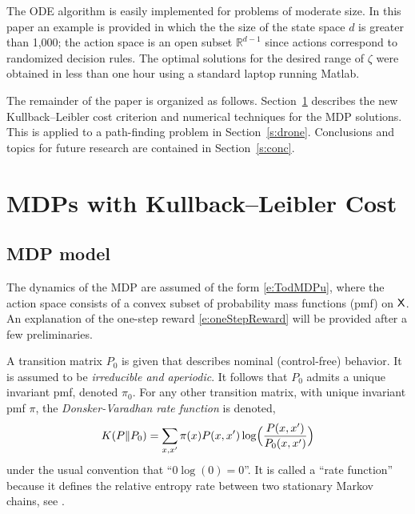 \documentclass[final,12pt]{colt2018} %
\def\state{{\sf X}}
\newcommand{\field}[1]{\mathbb{#1}}
\def\Re{\field{R}}
\def\Section#1{Section~\ref{#1}}
\def\Re{\field{R}}
\begin{document}
The ODE algorithm
is easily implemented for  problems of moderate size.   In this paper an example is provided in which the the size of the state space $d$ is greater than 1,000;   the action space is an open subset $\Re^{d-1}$ since actions correspond to randomized decision rules.   The optimal solutions for the desired range of $\zeta$ were obtained in less than one hour using a standard laptop running Matlab.

 



 



  
 
The remainder of the paper is organized as follows.   
\Section{s:design} describes the new Kullback--Leibler cost criterion and numerical techniques for the MDP solutions.    This is applied to a path-finding problem in \Section{s:drone}.
Conclusions and topics for future research are contained in \Section{s:conc}.




\section{MDPs with Kullback--Leibler Cost} 
\label{s:design}

 
 
\subsection{MDP model}   

The dynamics of the MDP are assumed of the form \eqref{e:TodMDPu},  where the action space consists of a convex subset of probability mass functions (pmf) on $\state$.  An explanation of the one-step reward  \eqref{e:oneStepReward} will be provided after a few preliminaries.


A transition matrix $P_0$ is given that describes  nominal (control-free) behavior.   It is assumed to be \textit{irreducible and aperiodic}.   It follows that $P_0$ admits a unique invariant pmf, denoted $\pi_0$.  For any other transition matrix, with unique invariant pmf $\pi$, the
 \textit{Donsker-Varadhan rate function} is denoted,
\begin{equation}
K(P\| P_0) = \sum_{x,x'} \pi(x) P(x,x')   \log \Bigl(\frac{P(x,x') }{P_0(x,x')} \Bigr)
\label{e:DVrate}
\end{equation}  
under the usual convention that ``$0\log(0) = 0$''.  
It is called a ``rate function'' because it defines the relative entropy rate between two stationary Markov chains, see
\cite{demzei98a}.
\end{document}
